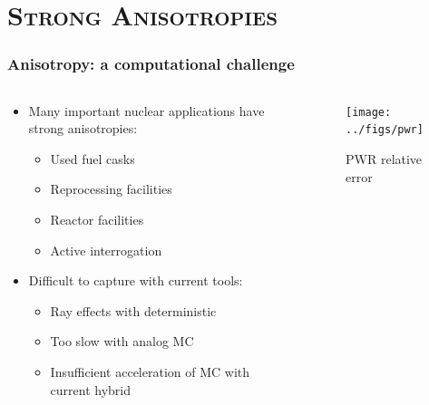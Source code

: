 \documentclass[xcolor=x11names,compress, handout]{beamer}
\renewcommand{\(}{\begin{columns}}
\renewcommand{\)}{\end{columns}}
\newcommand{\<}[1]{\begin{column}{#1}}
\renewcommand{\>}{\end{column}}
\begin{document}
\section{\scshape Strong Anisotropies}
\begin{frame}[fragile]
  \frametitle{Anisotropy: a computational challenge}

	\begin{columns}
  	\begin{column}{0.5\textwidth}
	\begin{itemize}
	\item Many important nuclear applications have strong anisotropies:
	 \begin{itemize}
	 \item Used fuel casks
	 \item Reprocessing facilities
	 \item Reactor facilities
	 \item Active interrogation 
	 \end{itemize}
	\pause
	\item Difficult to capture with current tools:
	 \begin{itemize}
	 \item Ray effects with deterministic
	 \item Too slow with analog MC
	 \item Insufficient acceleration of MC with current hybrid
	 \end{itemize}
	\end{itemize}
  	\end{column}
 	\begin{column}{0.5\textwidth}
 	 \begin{center}
 	 \begin{figure}
 	 \texttt{[image: ../figs/pwr]}  
 	 \caption{PWR relative error \cite{Pantelias2013}}
 	 \end{figure}
 	 \end{center}

  	\end{column}
	\end{columns}

\end{frame}
\end{document}
